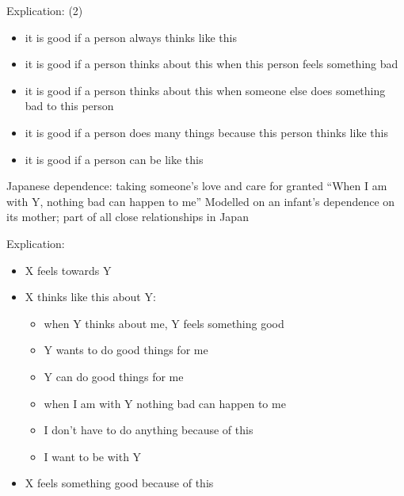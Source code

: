 \documentclass{beamer}
\begin{document}
\begin{frame}{Explication:   (2)}
  \begin{nsm}
  \begin{itemize}
  \item it is good if a person always thinks like this
  \item it is good if a person thinks about this when this person feels
    something bad
  \item it is good if a person thinks about this when someone else does
    something bad to this person
  \item it is good if a person does many things because this person thinks
    like this
  \item it is good if a person can be like this
  \end{itemize}
  \end{nsm}
\end{frame}

\begin{frame}{Japanese  }
  \Large
  dependence: taking someone's love and care for granted
  \vfill
  ``When I am with Y, nothing bad can happen to me''
  \vfill
  \normalsize
  Modelled on an infant's dependence on its mother; part of all close
  relationships in Japan
\end{frame}

\begin{frame}{Explication:  }
  \begin{nsm}
  \begin{itemize}
  \item X feels  towards Y
  \item X thinks like this about Y:
    \begin{itemize}
    \item when Y thinks about me, Y feels something good
    \item Y wants to do good things for me
    \item Y can do good things for me
    \item when I am with Y nothing bad can happen to me
    \item I don't have to do anything because of this
    \item I want to be with Y
    \end{itemize}
  \item X feels something good because of this
  \end{itemize}
  \end{nsm}
\end{frame}
\end{document}
